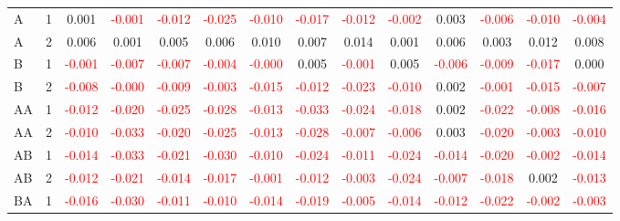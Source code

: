 \begin{table}[!htb]
{\begin{tabular}{llcccccccccccc}
A & 1 & 0.001 & \textcolor{red}{-0.001} & \textcolor{red}{-0.012} & \textcolor{red}{-0.025} & \textcolor{red}{-0.010} & \textcolor{red}{-0.017} & \textcolor{red}{-0.012} & \textcolor{red}{-0.002} & 0.003 & \textcolor{red}{-0.006} & \textcolor{red}{-0.010} & \textcolor{red}{-0.004}\\
A & 2 & 0.006 & 0.001 & 0.005 & 0.006 & 0.010 & 0.007 & 0.014 & 0.001 & 0.006 & 0.003 & 0.012 & 0.008\\
B & 1 & \textcolor{red}{-0.001} & \textcolor{red}{-0.007} & \textcolor{red}{-0.007} & \textcolor{red}{-0.004} & \textcolor{red}{-0.000} & 0.005 & \textcolor{red}{-0.001} & 0.005 & \textcolor{red}{-0.006} & \textcolor{red}{-0.009} & \textcolor{red}{-0.017} & 0.000\\
B & 2 & \textcolor{red}{-0.008} & \textcolor{red}{-0.000} & \textcolor{red}{-0.009} & \textcolor{red}{-0.003} & \textcolor{red}{-0.015} & \textcolor{red}{-0.012} & \textcolor{red}{-0.023} & \textcolor{red}{-0.010} & 0.002 & \textcolor{red}{-0.001} & \textcolor{red}{-0.015} & \textcolor{red}{-0.007}\\
AA & 1 & \textcolor{red}{-0.012} & \textcolor{red}{-0.020} & \textcolor{red}{-0.025} & \textcolor{red}{-0.028} & \textcolor{red}{-0.013} & \textcolor{red}{-0.033} & \textcolor{red}{-0.024} & \textcolor{red}{-0.018} & 0.002 & \textcolor{red}{-0.022} & \textcolor{red}{-0.008} & \textcolor{red}{-0.016}\\
AA & 2 & \textcolor{red}{-0.010} & \textcolor{red}{-0.033} & \textcolor{red}{-0.020} & \textcolor{red}{-0.025} & \textcolor{red}{-0.013} & \textcolor{red}{-0.028} & \textcolor{red}{-0.007} & \textcolor{red}{-0.006} & 0.003 & \textcolor{red}{-0.020} & \textcolor{red}{-0.003} & \textcolor{red}{-0.010}\\
AB & 1 & \textcolor{red}{-0.014} & \textcolor{red}{-0.033} & \textcolor{red}{-0.021} & \textcolor{red}{-0.030} & \textcolor{red}{-0.010} & \textcolor{red}{-0.024} & \textcolor{red}{-0.011} & \textcolor{red}{-0.024} & \textcolor{red}{-0.014} & \textcolor{red}{-0.020} & \textcolor{red}{-0.002} & \textcolor{red}{-0.014}\\
AB & 2 & \textcolor{red}{-0.012} & \textcolor{red}{-0.021} & \textcolor{red}{-0.014} & \textcolor{red}{-0.017} & \textcolor{red}{-0.001} & \textcolor{red}{-0.012} & \textcolor{red}{-0.003} & \textcolor{red}{-0.024} & \textcolor{red}{-0.007} & \textcolor{red}{-0.018} & 0.002 & \textcolor{red}{-0.013}\\
BA & 1 & \textcolor{red}{-0.016} & \textcolor{red}{-0.030} & \textcolor{red}{-0.011} & \textcolor{red}{-0.010} & \textcolor{red}{-0.014} & \textcolor{red}{-0.019} & \textcolor{red}{-0.005} & \textcolor{red}{-0.014} & \textcolor{red}{-0.012} & \textcolor{red}{-0.022} & \textcolor{red}{-0.002} & \textcolor{red}{-0.003}\\

\end{tabular}}
\end{table}
